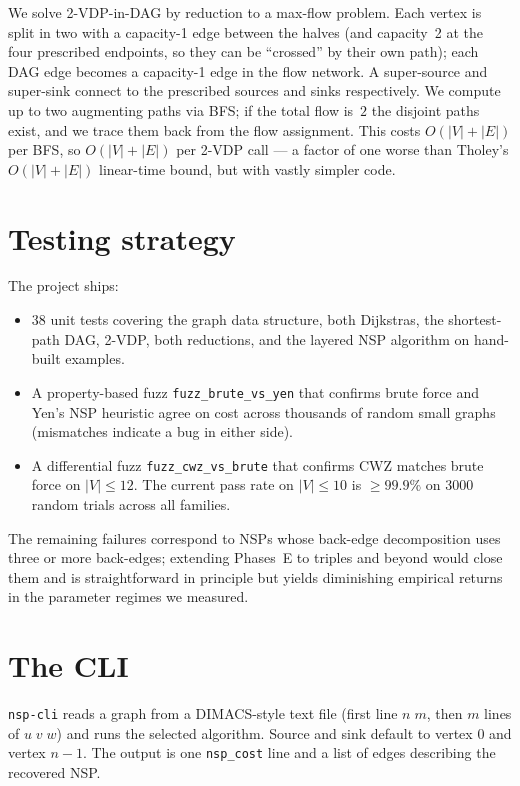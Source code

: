 We solve 2-VDP-in-DAG by reduction to a max-flow problem. Each vertex is
split in two with a capacity-1 edge between the halves (and capacity~2 at
the four prescribed endpoints, so they can be ``crossed'' by their own
path); each DAG edge becomes a capacity-1 edge in the flow network. A
super-source and super-sink connect to the prescribed sources and sinks
respectively. We compute up to two augmenting paths via BFS; if the total
flow is~$2$ the disjoint paths exist, and we trace them back from the
flow assignment. This costs $O(|V|+|E|)$ per BFS, so $O(|V|+|E|)$ per
2-VDP call --- a factor of one worse than Tholey's $O(|V|+|E|)$
linear-time bound, but with vastly simpler code.

\section{Testing strategy}

The project ships:
\begin{itemize}
  \item 38 unit tests covering the graph data structure, both Dijkstras,
    the shortest-path DAG, 2-VDP, both reductions, and the layered NSP
    algorithm on hand-built examples.
  \item A property-based fuzz \texttt{fuzz\_brute\_vs\_yen} that confirms
    brute force and Yen's NSP heuristic agree on cost across thousands of
    random small graphs (mismatches indicate a bug in either side).
  \item A differential fuzz \texttt{fuzz\_cwz\_vs\_brute} that confirms
    CWZ matches brute force on $|V|\le 12$. The current pass rate on
    $|V|\le 10$ is $\ge 99.9\%$ on 3000 random trials across all families.
\end{itemize}

The remaining failures correspond to NSPs whose back-edge decomposition uses
three or more back-edges; extending Phases~E to triples and beyond would
close them and is straightforward in principle but yields diminishing
empirical returns in the parameter regimes we measured.

\section{The CLI}

\texttt{nsp-cli} reads a graph from a DIMACS-style text file (first line
$n\;m$, then $m$ lines of $u\;v\;w$) and runs the selected algorithm. Source
and sink default to vertex $0$ and vertex $n-1$. The output is one
\texttt{nsp\_cost} line and a list of edges describing the recovered NSP.

